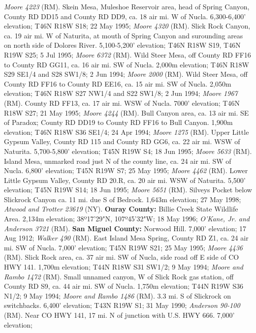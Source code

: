 \textit{Moore 4223} (RM).
Skein Mesa, Muleshoe Reservoir area, head of Spring Canyon, County RD DD15 and
County RD DD9, ca. 18 air mi. W of Nucla. 6,300-6,400' elevation;
T46N R18W S18; 22 May 1995; \textit{Moore 4320} (RM).
Slick Rock Canyon, ca. 19 air mi. W of Naturita, at mouth of Spring Canyon and
surounding areas on north side of Dolores River. 5,100-5,200' elevation;
T46N R18W S19, T46N R19W S25; 5 Jul 1995; \textit{Moore 6372} (RM).
Wild Steer Mesa, off County RD FF16 to County RD GG11, ca. 16 air mi. SW of
Nucla. 2,000m elevation; T46N R18W S29 SE1/4 and S28 SW1/8; 2 Jun 1994;
\textit{Moore 2000} (RM).
Wild Steer Mesa, off County RD FF16 to County RD EE16, ca. 15 air mi. SW of
Nucla. 2,050m elevation; T46N R18W S27 NW1/4 and S22 SW1/8; 2 Jun 1994;
\textit{Moore 1967} (RM).
County RD FF13, ca. 17 air mi. WSW of Nucla. 7000' elevation; T46N R18W S27;
21 May 1995; \textit{Moore 4244} (RM).
Bull Canyon area, ca. 13 air mi. SE of Paradox; County RD DD19 to County RD
FF16 to Bull Canyon. 1,900m elevation; T46N R18W S36 SE1/4; 24 Apr 1994;
\textit{Moore 1275} (RM).
Upper Little Gypsum Valley, County RD 115 and County RD GG6, ca. 22 air mi.
WSW of Naturita. 5,700-5,800' elevation; T45N R19W S4; 18 Jun 1995;
\textit{Moore 5633} (RM).
Island Mesa, unmarked road just N of the county line, ca. 24 air mi. SW of Nucla.
6,800' elevation; T45N R19W S7; 25 May 1995; \textit{Moore 4462} (RM).
Lower Little Gypsum Valley, County RD 20.R, ca. 20 air mi. WSW of Naturita.
5,500' elevation; T45N R19W S14; 18 Jun 1995; \textit{Moore 5651} (RM).
Silveys Pocket below Slickrock Canyon ca. 11 mi. due S of Bedrock.
1,643m elevation; 27 May 1998; \textit{Atwood and Trotter 23619} (NY).
  \textbf{Ouray County:}
Billie Creek State Wildlife Area. 2,134m elevation; 38º17'29"N,
107º45'32"W; 18 May 1996; \textit{O'Kane, Jr. and Anderson 3721} (RM).
  \textbf{San Miguel County:}
Norwood Hill. 7,000' elevation; 17 Aug 1912; \textit{Walker 490} (RM).
East Island Mesa Spring, County RD Z1, ca. 24 air mi. SW of Nucla.
7,000' elevation; T45N R19W S21; 25 May 1995; \textit{Moore 4436} (RM).
Slick Rock area, ca. 37 air mi. SW of Nucla, side road off E side of CO HWY
141. 1,700m elevation; T44N R18W S31 SW1/2; 9 May 1994;
\textit{Moore and Rambo 1472} (RM).
Small unnamed canyon, W of Slick Rock gas station, off County RD S9, ca. 44
air mi. SW of Nucla. 1,750m elevation; T44N R19W S36 N1/2; 9 May 1994;
\textit{Moore and Rambo 1486} (RM).
3.3 mi. S of Slickrock on switchbacks. 6,400' elevation; T43N R19W S1;
31 May 1990; \textit{Anderson 90-100} (RM).
Near CO HWY 141, 17 mi. N of junction with U.S. HWY 666. 7,000' elevation;
